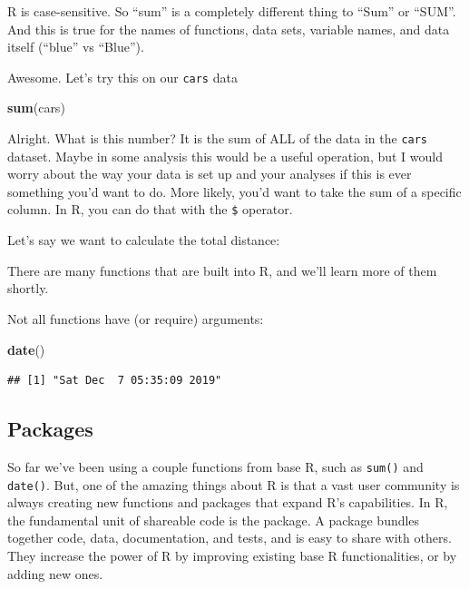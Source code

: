 \documentclass[]{book}
\newenvironment{Shaded}{\begin{snugshade}}{\end{snugshade}}
\newcommand{\KeywordTok}[1]{\textcolor[rgb]{0.13,0.29,0.53}{\textbf{#1}}}
\newcommand{\NormalTok}[1]{#1}
\newcommand{\OperatorTok}[1]{\textcolor[rgb]{0.81,0.36,0.00}{\textbf{#1}}}
\begin{document}
R is case-sensitive. So ``sum'' is a completely different thing to ``Sum'' or ``SUM''. And this is true for the names of functions, data sets, variable names, and data itself (``blue'' vs ``Blue'').

Awesome. Let's try this on our \texttt{cars} data

\begin{Shaded}
\begin{Highlighting}[]
\KeywordTok{sum}\NormalTok{(cars)}
\end{Highlighting}
\end{Shaded}

Alright. What is this number? It is the sum of ALL of the data in the \texttt{cars} dataset. Maybe in some analysis this would be a useful operation, but I would worry about the way your data is set up and your analyses if this is ever something you'd want to do. More likely, you'd want to take the sum of a specific column. In R, you can do that with the \texttt{\$} operator.

Let's say we want to calculate the total distance:

\begin{Shaded}
\end{Shaded}

There are many functions that are built into R, and we'll learn more of them shortly.

Not all functions have (or require) arguments:

\begin{Shaded}
\begin{Highlighting}[]
\KeywordTok{date}\NormalTok{()}
\end{Highlighting}
\end{Shaded}

\begin{verbatim}
## [1] "Sat Dec  7 05:35:09 2019"
\end{verbatim}

\hypertarget{packages}{%
\subsection{Packages}\label{packages}}

So far we've been using a couple functions from base R, such as \texttt{sum()} and \texttt{date()}. But, one of the amazing things about R is that a vast user community is always creating new functions and packages that expand R's capabilities. In R, the fundamental unit of shareable code is the package. A package bundles together code, data, documentation, and tests, and is easy to share with others. They increase the power of R by improving existing base R functionalities, or by adding new ones.
\end{document}
